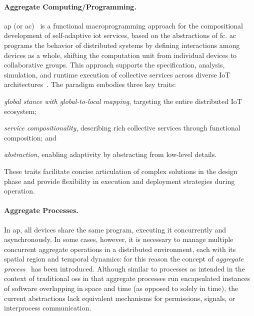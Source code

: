\documentclass[12pt, a4paper]{article}
\newenvironment{inlinelist}{\begin{enumerate*}[label=\emph{(\roman*)}]}{\end{enumerate*}}
\begin{document}
\paragraph{Aggregate Computing/Programming.}
\ac{ap} (or \ac{ac})~\cite{BealIEEEComputer2015} is a functional macroprogramming approach for the compositional development
of self-adaptive \ac{iot} services,
based on the abstractions of \ac{fc}.
%
\ac{ac} programs the behavior of distributed systems by defining interactions among devices as a whole,
shifting the computation unit from individual devices to collaborative groups.
%
This approach supports the specification, analysis, simulation,
and runtime execution of collective services across diverse IoT architectures~\cite{FI2020-pulverization}.
%
The paradigm embodies three key traits:
\begin{inlinelist}
    \item \emph{global stance with global-to-local mapping}, targeting the entire distributed IoT ecosystem;
    \item \emph{service compositionality}, describing rich collective services through functional composition;
    and
    \item \emph{abstraction}, enabling adaptivity by abstracting from low-level details.
\end{inlinelist}
%
These traits facilitate concise articulation of complex solutions in the design phase and provide flexibility in execution and deployment strategies during operation.
%

\sloppypar
\paragraph{Aggregate Processes.}
\label{par:aggregate-processes}

In \ac{ap},
all devices share the same program, executing it concurrently and asynchronously.
%
In some cases, however, it is necessary to manage multiple concurrent aggregate operations in a distributed environment,
each with its spatial region and temporal dynamics:
for this reason the concept of \emph{aggregate process}~\cite{aggregate-processes} has been introduced.
%
Although similar to processes as intended in the context of traditional \acp{os}
in that aggregate processes run encapsulated instances of software overlapping in space and time
(as opposed to solely in time),
the current abstractions lack equivalent mechanisms for permissions, signals, or interprocess communication.
\end{document}
